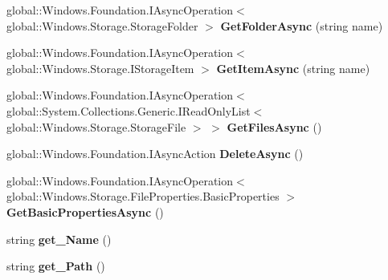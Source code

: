 \begin{DoxyCompactItemize}
\item 
\mbox{\label{class_windows_1_1_storage_1_1_storage_folder_abb723045c2ef18ea0a93b5788948994c}} 
global\+::\+Windows.\+Foundation.\+I\+Async\+Operation$<$ global\+::\+Windows.\+Storage.\+Storage\+Folder $>$ {\bfseries Get\+Folder\+Async} (string name)
\item 
\mbox{\label{class_windows_1_1_storage_1_1_storage_folder_ac931af40aac04b2aff19610399dbae2e}} 
global\+::\+Windows.\+Foundation.\+I\+Async\+Operation$<$ global\+::\+Windows.\+Storage.\+I\+Storage\+Item $>$ {\bfseries Get\+Item\+Async} (string name)
\item 
\mbox{\label{class_windows_1_1_storage_1_1_storage_folder_a03d5948527bd8ff44b485ba99e4fd723}} 
global\+::\+Windows.\+Foundation.\+I\+Async\+Operation$<$ global\+::\+System.\+Collections.\+Generic.\+I\+Read\+Only\+List$<$ global\+::\+Windows.\+Storage.\+Storage\+File $>$ $>$ {\bfseries Get\+Files\+Async} ()
\item 
\mbox{\label{class_windows_1_1_storage_1_1_storage_folder_ae60237b6aa50f6820009b4332c8abd48}} 
global\+::\+Windows.\+Foundation.\+I\+Async\+Action {\bfseries Delete\+Async} ()
\item 
\mbox{\label{class_windows_1_1_storage_1_1_storage_folder_ae9c02355139ce9e4530065b3ddfb717f}} 
global\+::\+Windows.\+Foundation.\+I\+Async\+Operation$<$ global\+::\+Windows.\+Storage.\+File\+Properties.\+Basic\+Properties $>$ {\bfseries Get\+Basic\+Properties\+Async} ()
\item 
\mbox{\label{class_windows_1_1_storage_1_1_storage_folder_a722592bfe76cdbc6678e09dca477b4fc}} 
string {\bfseries get\+\_\+\+Name} ()
\item 
\mbox{\label{class_windows_1_1_storage_1_1_storage_folder_a3c76cae5d410f07ee9f03d979f1b81f8}} 
string {\bfseries get\+\_\+\+Path} ()
\item 
\mbox{\label{class_windows_1_1_storage_1_1_storage_folder_aa385666b1143c539c3b9d8bbb270e8d1}} 

\end{DoxyCompactItemize}
